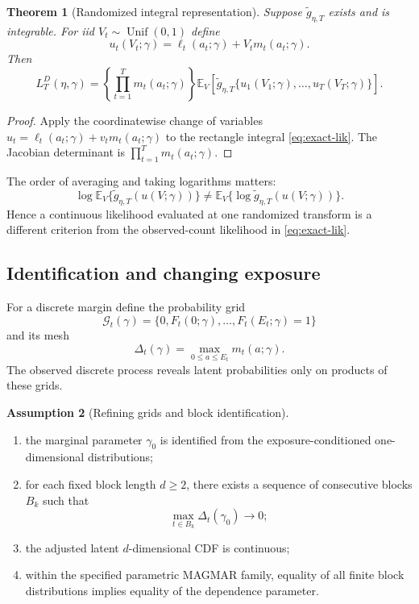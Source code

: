 \documentclass[11pt]{article}
\newtheorem{theorem}{Theorem}[section]
\theoremstyle{definition}
\newtheorem{assumption}[theorem]{Assumption}
\newcommand{\E}{\mathbb{E}}
\newcommand{\Unif}{\operatorname{Unif}}
\begin{document}
\begin{theorem}[Randomized integral representation]
\label{thm:randomized-integral}
Suppose $\widetilde g_{\eta,T}$ exists and is integrable. For iid
$V_t\sim\Unif(0,1)$ define
\[
u_t(V_t;\gamma)=\ell_t(a_t;\gamma)+V_t m_t(a_t;\gamma).
\]
Then
\begin{equation}
L_T^D(\eta,\gamma)
=
\left\{\prod_{t=1}^T m_t(a_t;\gamma)\right\}
\E_V\!\left[
\widetilde g_{\eta,T}
\{u_1(V_1;\gamma),\ldots,u_T(V_T;\gamma)\}
\right].
\label{eq:randomized-integral}
\end{equation}
\end{theorem}

\begin{proof}
Apply the coordinatewise change of variables
$u_t=\ell_t(a_t;\gamma)+v_t m_t(a_t;\gamma)$ to the rectangle integral
\eqref{eq:exact-lik}. The Jacobian determinant is
$\prod_{t=1}^T m_t(a_t;\gamma)$.
\end{proof}

The order of averaging and taking logarithms matters:
\[
\log \E_V\{\widetilde g_{\eta,T}(u(V;\gamma))\}
\neq
\E_V\{\log\widetilde g_{\eta,T}(u(V;\gamma))\}.
\]
Hence a continuous likelihood evaluated at one randomized transform is a different
criterion from the observed-count likelihood in \eqref{eq:exact-lik}.

\subsection{Identification and changing exposure}
\label{subsec:identification}

For a discrete margin define the probability grid
\[
\mathcal G_t(\gamma)
=
\{0,F_t(0;\gamma),\ldots,F_t(E_t;\gamma)=1\}
\]
and its mesh
\begin{equation}
\Delta_t(\gamma)=\max_{0\le a\le E_t}m_t(a;\gamma).
\label{eq:mesh}
\end{equation}
The observed discrete process reveals latent probabilities only on products of
these grids.

\begin{assumption}[Refining grids and block identification]
\label{ass:grid}
\begin{enumerate}[label=(\roman*)]
\item the marginal parameter $\gamma_0$ is identified from the
exposure-conditioned one-dimensional distributions;
\item for each fixed block length $d\ge2$, there exists a sequence of consecutive
blocks $B_k$ such that
\[
\max_{t\in B_k}\Delta_t(\gamma_0)\longrightarrow0;
\]
\item the adjusted latent $d$-dimensional CDF is continuous;
\item within the specified parametric MAGMAR family, equality of all finite block
distributions implies equality of the dependence parameter.
\end{enumerate}
\end{assumption}
\end{document}
